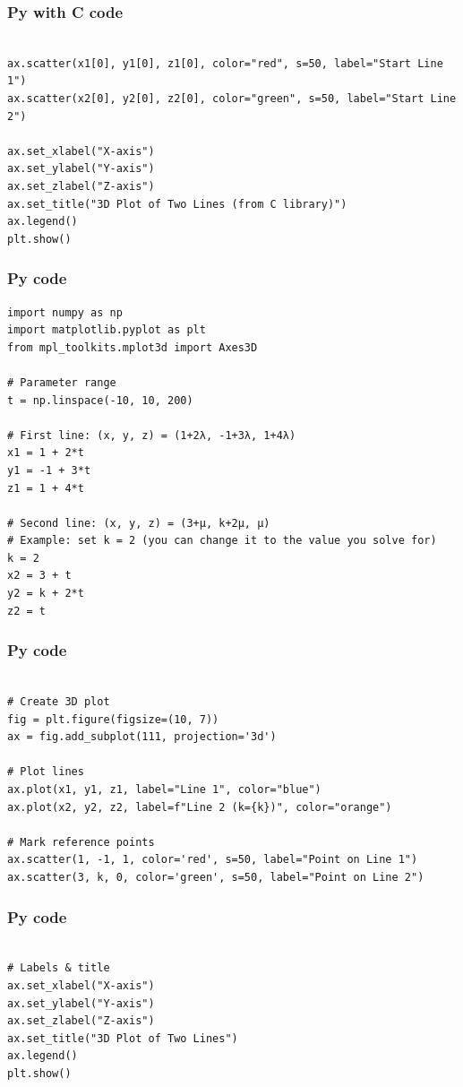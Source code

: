 \documentclass{beamer}
\begin{document}
\begin{frame}[fragile]
    \frametitle{Py with C code}
    \begin{lstlisting}

ax.scatter(x1[0], y1[0], z1[0], color="red", s=50, label="Start Line 1")
ax.scatter(x2[0], y2[0], z2[0], color="green", s=50, label="Start Line 2")

ax.set_xlabel("X-axis")
ax.set_ylabel("Y-axis")
ax.set_zlabel("Z-axis")
ax.set_title("3D Plot of Two Lines (from C library)")
ax.legend()
plt.show()
 \end{lstlisting}
\end{frame}
\begin{frame}[fragile]
    \frametitle{Py code}
    \begin{lstlisting}
import numpy as np
import matplotlib.pyplot as plt
from mpl_toolkits.mplot3d import Axes3D

# Parameter range
t = np.linspace(-10, 10, 200)

# First line: (x, y, z) = (1+2λ, -1+3λ, 1+4λ)
x1 = 1 + 2*t
y1 = -1 + 3*t
z1 = 1 + 4*t

# Second line: (x, y, z) = (3+μ, k+2μ, μ)
# Example: set k = 2 (you can change it to the value you solve for)
k = 2
x2 = 3 + t
y2 = k + 2*t
z2 = t
 \end{lstlisting}
\end{frame}
\begin{frame}[fragile]
    \frametitle{Py code}
    \begin{lstlisting}

# Create 3D plot
fig = plt.figure(figsize=(10, 7))
ax = fig.add_subplot(111, projection='3d')

# Plot lines
ax.plot(x1, y1, z1, label="Line 1", color="blue")
ax.plot(x2, y2, z2, label=f"Line 2 (k={k})", color="orange")

# Mark reference points
ax.scatter(1, -1, 1, color='red', s=50, label="Point on Line 1")
ax.scatter(3, k, 0, color='green', s=50, label="Point on Line 2")
 \end{lstlisting}
\end{frame}
\begin{frame}[fragile]
    \frametitle{Py code}
    \begin{lstlisting}

# Labels & title
ax.set_xlabel("X-axis")
ax.set_ylabel("Y-axis")
ax.set_zlabel("Z-axis")
ax.set_title("3D Plot of Two Lines")
ax.legend()
plt.show()
\end{lstlisting}
\end{frame}
\end{document}
